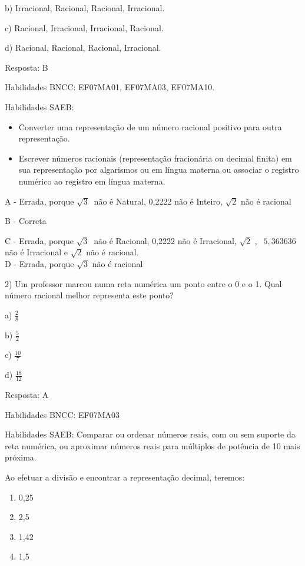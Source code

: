 b) Irracional, Racional, Racional, Irracional.

c) Racional, Irracional, Irracional, Racional.

d) Racional, Racional, Racional, Irracional.

Resposta: B

Habilidades BNCC: EF07MA01, EF07MA03, EF07MA10.

Habilidades SAEB:

\begin{itemize}
\item
  Converter uma representação de um número racional positivo para outra
  representação.
\item
  Escrever números racionais (representação fracionária ou decimal
  finita) em sua representação por algarismos ou em língua materna ou
  associar o registro numérico ao registro em língua materna.
\end{itemize}

A - Errada, porque \(\sqrt{3}\ \) não é Natural, 0,2222 não é Inteiro,
\(\sqrt{2}\) não é racional

B - Correta

C - Errada, porque \(\sqrt{3}\ \) não é Racional, 0,2222 não é
Irracional, \(\sqrt{2}\) , \(\ \ 5,363636\)não é Irracional e
\(\sqrt{2}\) não é racional.\\
D - Errada, porque \(\sqrt{3}\) não é racional

2) Um professor marcou numa reta numérica um ponto entre o 0 e o 1. Qual
número racional melhor representa este ponto?

a) \(\frac{2}{8}\)

b) \(\frac{5}{2}\)

c) \(\frac{10}{7}\)

d) \(\frac{18}{12}\)

Resposta: A

Habilidades BNCC: EF07MA03

Habilidades SAEB: Comparar ou ordenar números reais, com ou sem suporte
da reta numérica, ou aproximar números reais para múltiplos de potência
de 10 mais próxima.

Ao efetuar a divisão e encontrar a representação decimal, teremos:

\begin{enumerate}
\def\labelenumi{\alph{enumi})}
\item
  0,25
\item
  2,5
\item
  1,42
\item
  1,5
\end{enumerate}

